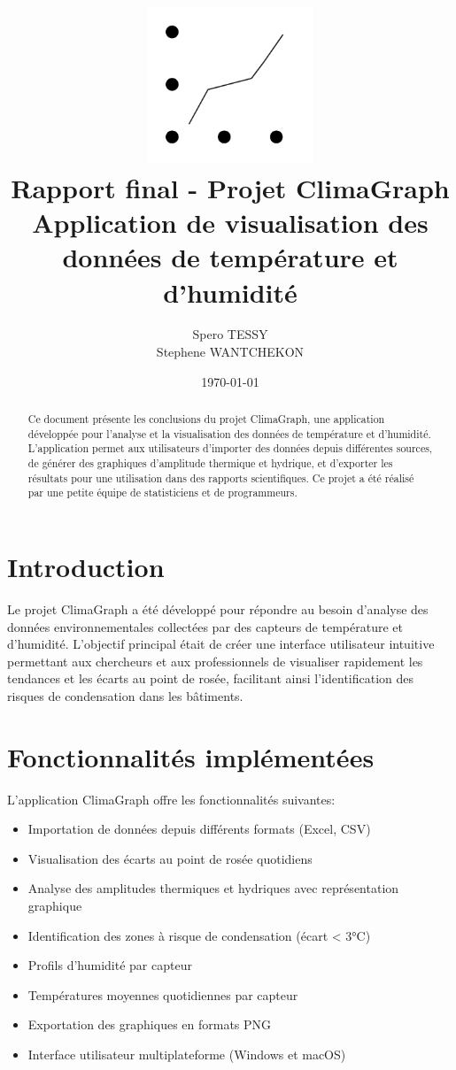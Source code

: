 \documentclass[a4paper,11pt]{article}
\title{
    \includegraphics[width=5cm]{../ui/assets/img/logo.png}\\[1cm]
    \textbf{Rapport final - Projet ClimaGraph}\\
    \large{Application de visualisation des données de température et d'humidité}
}
\author{Spero TESSY \\ Stephene WANTCHEKON }
\date{\today}
\begin{document}
\maketitle

\begin{abstract}
Ce document présente les conclusions du projet ClimaGraph, une application développée pour l'analyse et la visualisation des données de température et d'humidité. L'application permet aux utilisateurs d'importer des données depuis différentes sources, de générer des graphiques d'amplitude thermique et hydrique, et d'exporter les résultats pour une utilisation dans des rapports scientifiques. Ce projet a été réalisé par une petite équipe de statisticiens et de programmeurs.
\end{abstract}

\section{Introduction}

Le projet ClimaGraph a été développé pour répondre au besoin d'analyse des données environnementales collectées par des capteurs de température et d'humidité. L'objectif principal était de créer une interface utilisateur intuitive permettant aux chercheurs et aux professionnels de visualiser rapidement les tendances et les écarts au point de rosée, facilitant ainsi l'identification des risques de condensation dans les bâtiments.

\section{Fonctionnalités implémentées}

L'application ClimaGraph offre les fonctionnalités suivantes:

\begin{itemize}
    \item Importation de données depuis différents formats (Excel, CSV)
    \item Visualisation des écarts au point de rosée quotidiens
    \item Analyse des amplitudes thermiques et hydriques avec représentation graphique
    \item Identification des zones à risque de condensation (écart < 3°C)
    \item Profils d'humidité par capteur
    \item Températures moyennes quotidiennes par capteur
    \item Exportation des graphiques en formats PNG
    \item Interface utilisateur multiplateforme (Windows et macOS)
\end{itemize}
\end{document}
